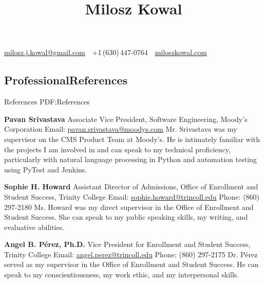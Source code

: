 \documentclass[letterpaper,10pt,oneside]{article}
\newcommand{\CVAuthor}{Milosz Kowal}
\newcommand{\CVWebpage}{https://miloszkowal.com}
\begin{document}

\title{\CVAuthor}

\begin{subtitle}
\begin{comment}
\end{comment}
\href{mailto:milosz.j.kowal@gmail.com}
{milosz.j.kowal@gmail.com}
\,\SubBulletSymbol\,
+1\,(630)\,447-0764
\,\SubBulletSymbol\,
\href{\CVWebpage}
{miloszkowal.com}
\end{subtitle}

\begin{body}



\section
{Professional\newline References}
{References}
{PDF:References}

{\textbf{Pavan Srivastava}}
\hfill
\GapNoBreak
\BulletItem
Associate Vice President, Software Engineering, Moody's Corporation
\BulletItem
Email: \href{mailto:pavan.srivastava@moodys.com}{pavan.srivastava@moodys.com}
\BulletItem
Mr. Srivastava was my supervisor on the CMS Product Team at Moody's. He is intimately familiar with the projects I am involved in and can speak to my technical proficiency, particularly with natural language processing in Python and automation testing using PyTest and Jenkins.

\BigGapNoBreak

{\textbf{Sophie H. Howard}}
\hfill
\GapNoBreak
\BulletItem
Assistant Director of Admissions, Office of Enrollment and Student Success, Trinity College
\BulletItem
Email: \href{mailto:sophie.howard@trincoll.edu}{sophie.howard@trincoll.edu}
\BulletItem
Phone: (860) 297-2180
\BulletItem
Ms. Howard was my direct supervisor in the Office of Enrollment and Student Success. She can speak to my public speaking skills, my writing, and evaluative abilities.

\BigGapNoBreak

{\textbf{Angel B. Pérez, Ph.D.}}
\hfill
\GapNoBreak
\BulletItem
Vice President for Enrollment and Student Success, Trinity College
\BulletItem
Email: \href{mailto:angel.perez@trincoll.edu}{angel.perez@trincoll.edu}
\BulletItem
Phone: (860) 297-2175
\BulletItem
Dr. Pérez served as my supervisor in the Office of Enrollment and Student Success. He can speak to my conscientiousness, my work ethic, and my interpersonal skills.


\end{body}
\end{document}
